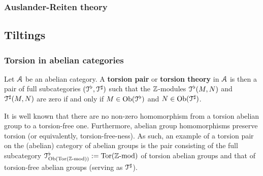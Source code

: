         \subsubsection{Auslander-Reiten theory}
        
    \subsection{Tiltings}
        \subsubsection{Torsion in abelian categories}
            \begin{definition} \label{def: torsion_pairs}
                Let $\mathcal{A}$ be an abelian category. A \textbf{torsion pair} or \textbf{torsion theory} in $\mathcal{A}$ is then a pair of full subcategories $(\mathcal{T}^{\flat}, \mathcal{T}^{\sharp})$ such that the $\mathbb{Z}$-modules $\mathcal{T}^{\flat}(M, N)$ and $\mathcal{T}^{\sharp}(M, N)$ are zero if and only if $M \in \mathrm{Ob}(\mathcal{T}^{\flat})$ and $N \in \mathrm{Ob}(\mathcal{T}^{\sharp})$.
            \end{definition}
            \begin{example}
                It is well known that there are no non-zero homomorphism from a torsion abelian group to a torsion-free one. Furthermore, abelian group homomorphisms preserve torsion (or equivalently, torsion-free-ness). As such, an example of a torsion pair on the (abelian) category of abelian groups is the pair consisting of the full subcategory $\mathcal{T}^{\flat}_{\mathrm{Ob}(\mathrm{Tor}(\mathbb{Z}\text{-}\mathrm{mod}))} := \mathrm{Tor}(\mathbb{Z}\text{-}\mathrm{mod})$ of torsion abelian groups and that of torsion-free abelian groups (serving as $\mathcal{T}^{\sharp}$). 
            \end{example}
